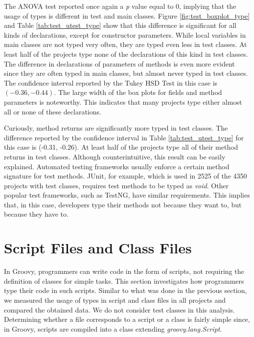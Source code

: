 \documentclass[msc]{ppgccufmg}
\begin{document}
The ANOVA test reported once again a \emph{p} value equal to 0, implying that the usage of types is different in test and main classes.
Figure \ref{fig:test_boxplot_type} and Table \ref{tab:test_utest_type} show that this difference is significant for all kinds of declarations, except for constructor parameters.
While local variables in main classes are not typed very often, they are typed even less in test classes.
At least half of the projects type none of the declarations of this kind in test classes.
The difference in declarations of parameters of methods is even more evident since they are often typed in main classes, but almost never typed in test classes.
The confidence interval reported by the Tukey HSD Test in this case is $(-0.36, -0.44)$.
The large width of the box plots for fields and method parameters is noteworthy.
This indicates that many projects type either almost all or none of these declarations.

Curiously, method returns are significantly more typed in test classes.
The difference reported by the confidence interval in Table \ref{tab:test_utest_type} for this case is (-0.31, -0.26).
At least half of the projects type all of their method returns in test classes.
Although counterintuitive, this result can be easily explained.
Automated testing frameworks usually enforce a certain method signature for test methods.
JUnit, for example, which is used in 2525 of the 4350 projects with test classes, requires test methods to be typed as \emph{void}.
Other popular test frameworks, such as TestNG, have similar requirements.
This implies that, in this case, developers type their methods not because they want to, but because they have to.





\section{Script Files and Class Files\label{sec:results-scripts}}
In Groovy, programmers can write code in the form of scripts, not requiring the definition of classes for simple tasks.
This section investigates how programmers type their code in such scripts.
Similar to what was done in the previous section, we measured the usage of types in script and class files in all projects and compared the obtained data.
We do not consider test classes in this analysis.
Determining whether a file corresponds to a script or a class is fairly simple since, in Groovy, scripts are compiled into a class extending \emph{groovy.lang.Script}.
\end{document}
